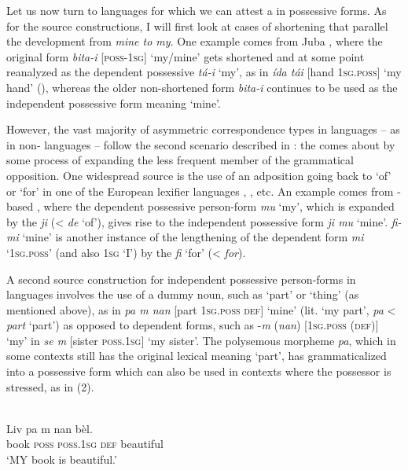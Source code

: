 \documentclass[output=paper]{langsci/langscibook}
\begin{document}
Let us now turn to  languages for which we can attest a  in possessive forms. As for the source constructions, I will first look at cases of shortening that parallel the  development from \textit{mine to my}. One example comes from Juba , where the original form \textit{bita-i} [\textsc{poss-1sg}] ‘my/mine’ gets shortened and at some point reanalyzed as the dependent possessive \textit{tá-i} ‘my’, as in \textit{ída tái} [hand \textsc{1sg.poss}] ‘my hand’ (\citealt{ManfrediPetrollino2013}), whereas the older non-shortened form \textit{bita-i} continues to be used as the independent possessive form meaning ‘mine’. 

However, the vast majority of asymmetric correspondence types in  languages – as in non- languages – follow the second scenario described in : the  comes about by some process of expanding the less frequent member of the grammatical opposition. One widespread source is the use of an adposition going back to ‘of’ or ‘for’ in one of the European lexifier languages , ,  etc. An example comes from -based  \citep{Hagemeijer2013}, where the dependent possessive person-form \textit{mu} ‘my’, which is expanded by the   \textit{ji} (<  \textit{de} ‘of’), gives rise to the independent possessive form \textit{ji mu} ‘mine’.  \textit{fi-mi} ‘mine’ is another instance of the lengthening of the dependent form \textit{mi} \textsc{‘1sg.poss’} (and also 1\textsc{sg} ‘I’) by the  \textit{fi} ‘for’ (<  \textit{for}).

A second source construction for independent possessive person-forms in  languages involves the use of a dummy noun, such as ‘part’ or ‘thing’ (as mentioned above), as in  \textit{pa m nan} [part \textsc{1sg.poss} \textsc{def}] ‘mine’ (lit. ‘my part’, \textit{pa} <  \textit{part} ‘part’) as opposed to dependent forms, such as -\textit{m} (\textit{nan}) [\textsc{1sg.poss} \textsc{(def)]} ‘my’ in \textit{se m} [sister \textsc{poss.1sg]} ‘my sister’. The polysemous morpheme \textit{pa}, which in some contexts still has the original lexical meaning ‘part’, has grammaticalized into a possessive form which can also be used in contexts where the possessor is stressed, as in (2).

\ea
{ \citep{Fattier2013}  }\\
\gll Liv  pa  m    nan  bèl.\\
     book  \textsc{poss}  \textsc{poss.1sg} \textsc{def}  beautiful \\
\glt ‘MY book is beautiful.’
\z
\end{document}
